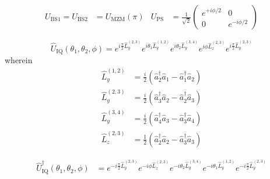 \begin{align}
	U_\text{BS1}
	=
	U_\text{BS2}
	&=
	U_\text{MZM}(\pi)
	&
	U_\text{PS}
	&=
	\frac{1}{\sqrt{2}}
	\begin{pmatrix}
		e^{+i\phi/2} & 0 \\
		0 & e^{-i\phi/2}
	\end{pmatrix}
\end{align}

\begin{equation}
	\hat{U}_\text{IQ}(\theta_1,\theta_2,\phi)
	=
	e^{i\frac{\pi}{2}\hat{L}_y^{(2,3)}}
	e^{i\theta_1\hat{L}_y^{(1,2)}}
	e^{i\theta_2\hat{L}_y^{(3,4)}}
	e^{i\phi\hat{L}_z^{(2,3)}}
	e^{i\frac{\pi}{2}\hat{L}_y^{(2,3)}}
\end{equation}
wherein~\cite{Leonhardt2010}
\begin{align}
	\hat{L}_y^{(1,2)}
	&=
	\frac{i}{2}
	\left(
		\hat{a}_2^\dagger
		\hat{a}_1
		-
		\hat{a}_1^\dagger
		\hat{a}_2
	\right)
	\\
	\hat{L}_y^{(2,3)}
	&=
	\frac{i}{2}
	\left(
		\hat{a}_3^\dagger
		\hat{a}_2
		-
		\hat{a}_2^\dagger
		\hat{a}_3
	\right)
	\\
	\hat{L}_y^{(3,4)}
	&=
	\frac{i}{2}
	\left(
		\hat{a}_4^\dagger
		\hat{a}_3
		-
		\hat{a}_3^\dagger
		\hat{a}_4
	\right)
	\\
	\hat{L}_z^{(2,3)}
	&=
	\frac{1}{2}
	\left(
		\hat{a}_2^\dagger
		\hat{a}_2
		-
		\hat{a}_3^\dagger
		\hat{a}_3
	\right)
\end{align}

\begin{equation}
	\begin{split}
		\hat{U}_\text{IQ}^\dagger(\theta_1,\theta_2,\phi)
		&=
		e^{-i\frac{\pi}{2}\hat{L}_y^{(2,3)}}
		e^{-i\phi\hat{L}_z^{(2,3)}}
		e^{-i\theta_2\hat{L}_y^{(3,4)}}
		e^{-i\theta_1\hat{L}_y^{(1,2)}}
		e^{-i\frac{\pi}{2}\hat{L}_y^{(2,3)}}
	\end{split}
\end{equation}

